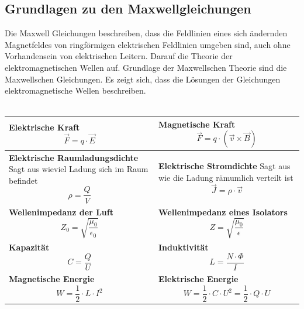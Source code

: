 \subsection{Grundlagen zu den Maxwellgleichungen}
Die Maxwell Gleichungen beschreiben, dass die Feldlinien eines sich ändernden Magnetfeldes von ringförmigen elektrischen Feldlinien umgeben sind, auch ohne Vorhandensein von elektrischen Leitern. Darauf die Theorie der elektromagnetischen Wellen auf. Grundlage der Maxwellschen Theorie sind die Maxwellschen Gleichungen. Es zeigt sich, dass die Lösungen der Gleichungen elektromagnetische Wellen beschreiben.\\
\vspace{0.2cm}\\
\renewcommand{\arraystretch}{1.2}
\begin{tabular}{|p{} |p{}|}
	\hline
	\textbf{Elektrische Kraft}\newline
	\[\vec{F}=q\cdot \vec{E}\]&
	\textbf{Magnetische Kraft}\newline
	\[\vec{F}=q\cdot(\vec{v}\times \vec{B})\]\\
	\hline
	\textbf{Elektrische Raumladungsdichte}\newline
	Sagt aus wieviel Ladung sich im Raum befindet\newline
	\[ \rho  = \frac{Q}{V}\]&
	\textbf{Elektrische Stromdichte}\newline
	Sagt aus wie die Ladung rämumlich verteilt ist\newline
	\[\vec{J}=\rho \cdot \vec{v}\]\\
	\hline
	\textbf{Wellenimpedanz der Luft}\newline
	\[Z_{0}=\sqrt{\frac{\mu_{0}}{\epsilon_{0}}} \]&
	\textbf{Wellenimpedanz eines Isolators}\newline
	\[Z=\sqrt{\frac{\mu_{0}}{\epsilon}} \]\\
	\hline
	\textbf{Kapazität}\newline
	\[C=\frac{Q}{U} \] &
	\textbf{Induktivität}\newline
	\[L=\frac{N\cdot \Phi }{I} \]\\
	\hline
	\textbf{Magnetische Energie}\newline
	\[W= \frac{1}{2}\cdot L \cdot I^{2}\]&
	\textbf{Elektrische Energie}\newline
	\[W= \frac{1}{2}\cdot C \cdot U^{2}=\frac{1}{2}\cdot Q\cdot U \]\\
	\hline
\end{tabular}
